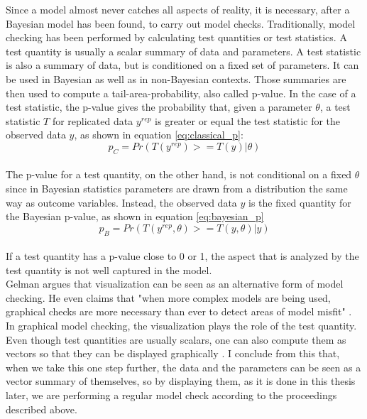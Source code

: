 \documentclass{article}
\begin{document}
Since a model almost never catches all aspects of reality, it is necessary, after a Bayesian model has been found, to carry out model checks. Traditionally, model checking has been performed by calculating test quantities or test statistics. A test quantity is usually a scalar summary of data and parameters. A test statistic is also a summary of data, but is conditioned on a fixed set of parameters. It can be used in Bayesian as well as in non-Bayesian contexts. Those summaries are then used to compute a tail-area-probability, also called p-value. In the case of a test statistic, the p-value gives the probability that, given a parameter $\theta$, a test statistic $T$ for replicated data $y^{rep}$ is greater or equal the test statistic  for the observed data $y$, as shown in equation \ref{eq:classical_p}:
\begin{equation}
p_C = Pr(T(y^{rep}) >= T(y) | \theta)
\label{eq:classical_p}
\end{equation}
\cite{1439840954}\\
The p-value for a test quantity, on the other hand, is not conditional on a fixed $\theta$ since in Bayesian statistics parameters are drawn from a distribution the same way as outcome variables. Instead, the observed data $y$ is the fixed quantity for the Bayesian p-value, as shown in equation \ref{eq:bayesian_p}
\begin{equation}
p_B = Pr(T(y^{rep},\theta) >= T(y,\theta) | y)
\label{eq:bayesian_p}
\end{equation}
\cite{1439840954}\\
If a test quantity has a p-value close to 0 or 1, the aspect that is analyzed by the test quantity is not well captured in the model.\\
Gelman \cite{gelman2004exploratory} argues that visualization can be seen as an alternative form of model checking. He even claims that "when more complex models are being used, graphical checks are more necessary than ever to detect areas of model misfit" \cite{gelman2004exploratory}. In graphical model checking, the visualization plays the role of the test quantity. Even though test quantities are usually scalars, one can also compute them as vectors so that they can be displayed graphically \cite{gelman2004exploratory}. I conclude from this that, when we take this one step further, the data and the parameters can be seen as a vector summary of themselves, so by displaying them, as it is done in this thesis later, we are performing a regular model check according to the proceedings described above.
\end{document}
